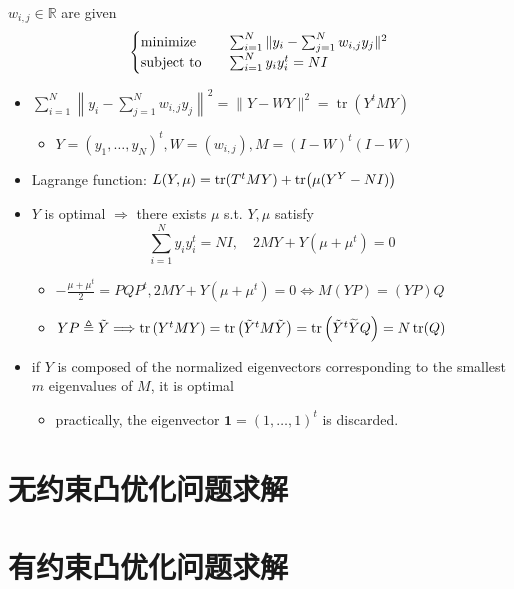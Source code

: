 \begin{remark}
    $w_{i, j} \in \mathbb{R}$ are given\[\begin{cases}
        \operatorname{minimize} \quad &\sum_{i = 1}^N\|y_i - \sum_{j = 1}^Nw_{i, j}y_j\|^2\\
        \operatorname{subject\ to} \quad &\sum_{i = 1}^N y_iy_i^t = NI
    \end{cases}\]
    \begin{itemize}
        \item $\sum_{i=1}^{N}\left\|y_{i}-\sum_{j=1}^{N} w_{i, j} y_{j}\right\|^{2}=\|Y-W Y\|^{2}=\operatorname{tr}\left(Y^{t} M Y\right)$\begin{itemize}
            \item $Y=\left(y_{1}, \ldots, y_{N}\right)^{t}, W=\left(w_{i, j}\right), M=(I-W)^{t}(I-W)$
        \end{itemize}
        \item Lagrange function: $L(Y, \mu) = \tr(T^tMY) + \tr(\mu(Y^Y - NI))$
        \item $Y$ is optimal $\Longrightarrow$ there exists $\mu$ s.t. $Y, \mu$ satisfy \[\sum_{i=1}^{N} y_{i} y_{i}^{t}=N I, \quad 2 M Y+Y\left(\mu+\mu^{t}\right)=0\]\begin{itemize}
            \item $-\frac{\mu+\mu^{t}}{2}=P Q P^{t}, 2 M Y+Y\left(\mu+\mu^{t}\right)=0 \Longleftrightarrow M(Y P)=(Y P) Q$
            \item $Y P \triangleq \tilde{Y} \Longrightarrow \tr\left(Y^{t} M Y\right)=\tr\left(\tilde{Y}^{t} M \tilde{Y}\right)=\tr\left(\tilde{Y}^{t} \widetilde{Y} Q\right)=N \tr(Q)$
        \end{itemize}
        \item if $Y$ is composed of the normalized eigenvectors corresponding to the smallest $m$ eigenvalues of $M$, it is optimal\begin{itemize}
            \item practically, the eigenvector $\mathbf{1} = (1, \dots, 1)^t$ is discarded.
        \end{itemize}
    \end{itemize}
\end{remark}


\section{无约束凸优化问题求解}



\section{有约束凸优化问题求解}

